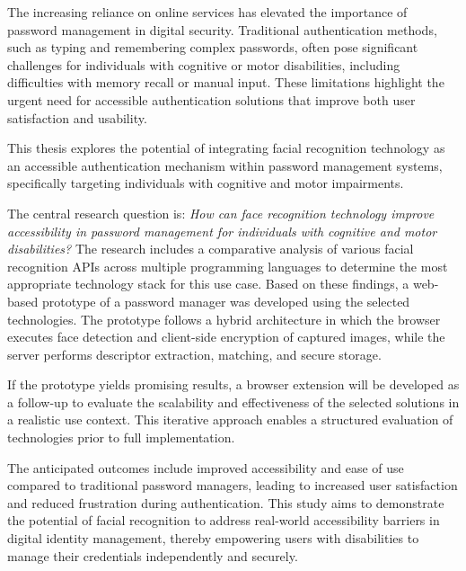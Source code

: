 The increasing reliance on online services has elevated the importance of password management in digital security. Traditional authentication methods, such as typing and remembering complex passwords, often pose significant challenges for individuals with cognitive or motor disabilities, including difficulties with memory recall or manual input. These limitations highlight the urgent need for accessible authentication solutions that improve both user satisfaction and usability.

This thesis explores the potential of integrating facial recognition technology as an accessible authentication mechanism within password management systems, specifically targeting individuals with cognitive and motor impairments.

The central research question is: \emph{How can face recognition technology improve accessibility in password management for individuals with cognitive and motor disabilities?} The research includes a comparative analysis of various facial recognition APIs across multiple programming languages to determine the most appropriate technology stack for this use case. Based on these findings, a web-based prototype of a password manager was developed using the selected technologies. The prototype follows a hybrid architecture in which the browser executes face detection and client-side encryption of captured images, while the server performs descriptor extraction, matching, and secure storage.

If the prototype yields promising results, a browser extension will be developed as a follow-up to evaluate the scalability and effectiveness of the selected solutions in a realistic use context. This iterative approach enables a structured evaluation of technologies prior to full implementation.

The anticipated outcomes include improved accessibility and ease of use compared to traditional password managers, leading to increased user satisfaction and reduced frustration during authentication. This study aims to demonstrate the potential of facial recognition to address real-world accessibility barriers in digital identity management, thereby empowering users with disabilities to manage their credentials independently and securely.
